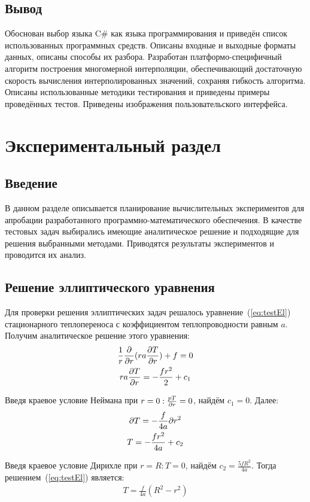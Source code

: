 \subsection{Вывод}
Обоснован выбор языка C\# как языка программирования и приведён список 
использованных программных средств. Описаны входные и выходные форматы 
данных, описаны способы их разбора. Разработан платформо-специфичный алгоритм 
построения многомерной интерполяции, обеспечивающий достаточную скорость 
вычисления интерполированных значений, сохраняя гибкость алгоритма. Описаны 
использованные методики тестирования и приведены примеры проведённых тестов. 
Приведены изображения пользовательского интерфейса.

\section{Экспериментальный раздел}
\subsection{Введение}
В данном разделе описывается планирование вычислительных экспериментов для 
апробации разработанного программно-математического обеспечения. В качестве 
тестовых задач выбирались имеющие аналитическое решение и подходящие для 
решения выбранными методами. Приводятся результаты экспериментов и проводится 
их анализ.

\subsection{Решение эллиптического уравнения}
Для проверки решения эллиптических задач решалось уравнение~(\ref{eq:testEl}) 
стационарного теплопереноса с коэффициентом теплопроводности равным $a$. 
Получим аналитическое решение этого уравнения:
\begin{gather*}
    \frac{1}{r} \frac{\partial}{\partial r}(r a \frac{\partial T}{\partial r}) + f = 0 
    \label{eq:testEl}\\
    ra \frac{\partial T}{\partial r} = - \frac{fr^2}{2} + c_1\\
\end{gather*}

Введя краевое условие Неймана при $r=0: \frac{p T} {\partial r} = 0$, найдём $c_1 = 
0$. Далее:
\begin{gather*}
    \partial T = - \frac{f}{4 a} \partial r^2\\
    T = - \frac{f r^2}{4 a} + c_2
\end{gather*}

Введя краевое условие Дирихле при $r=R: T = 0$, найдём $c_2 = \frac{5f R^2}{4 
a}$. Тогда решением~(\ref{eq:testEl}) является:
\begin{gather*}
T = \frac{f}{4 a}(R^2 - r^2)
\end{gather*}

